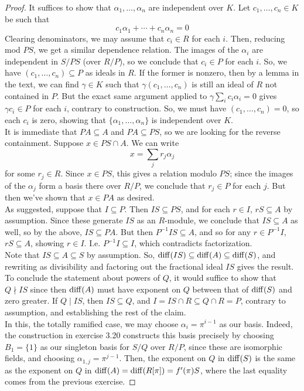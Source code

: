\begin{proof}
	It suffices to show that $\alpha_1,\ldots,\alpha_n$ are independent over $K$. Let $c_1,\ldots,c_n \in K$ be such that
	\[ c_1\alpha_1 + \cdots + c_n\alpha_n = 0 \]
	Clearing denominators, we may assume that $c_i \in R$ for each $i$. Then, reducing mod $PS$, we get a similar dependence relation. The images of the $\alpha_i$ are independent in $S/PS$ (over $R/P$), so we conclude that $c_i \in P$ for each $i$. So, we have $(c_1,\ldots,c_n) \subseteq P$ as ideals in $R$. If the former is nonzero, then by a lemma in the text, we can find $\gamma \in K$ such that $\gamma(c_1,\ldots,c_n)$ is still an ideal of $R$ not contained in $P$. But the exact same argument applied to $\gamma\sum_i c_i\alpha_i = 0$ gives $\gamma c_i \in P$ for each $i$, contrary to construction. So, we must have $(c_1,\ldots,c_n) = 0$, so each $c_i$ is zero, showing that $\{\alpha_1,\ldots,\alpha_n\}$ is independent over $K$. \\
	
	It is immediate that $PA \subseteq A$ and $PA \subseteq PS$, so we are looking for the reverse containment. Suppose $x \in PS \cap A$. We can write
	\[ x = \sum_j r_j\alpha_j \]
	for some $r_j \in R$. Since $x \in PS$, this gives a relation modulo $PS$; since the images of the $\alpha_j$ form a basis there over $R/P$, we conclude that $r_j \in P$ for each $j$. But then we've shown that $x \in PA$ as desired. \\
	
	As suggested, suppose that $I \subseteq P$. Then $IS \subseteq PS$, and for each $r \in I$, $rS \subseteq A$ by assumption. Since these generate $IS$ as an $R$-module, we conclude that $IS \subseteq A$ as well, so by the above, $IS \subseteq PA$. But then $P^{-1}IS \subseteq A$, and so for any $r \in P^{-1}I$, $rS \subseteq A$, showing $r \in I$. I.e. $P^{-1}I \subseteq I$, which contradicts factorization. \\
	
	Note that $IS \subseteq A \subseteq S$ by assumption. So, $\operatorname{diff}(IS) \subseteq \operatorname{diff}(A) \subseteq \operatorname{diff}(S)$, and rewriting as divisibility and factoring out the fractional ideal $IS$ gives the result. To conclude the statement about powers of $Q$, it would suffice to show that $Q \nmid IS$ since then $\operatorname{diff}(A)$ must have exponent on $Q$ between that of $\operatorname{diff}(S)$ and zero greater. If $Q \mid IS$, then $IS \subseteq Q$, and $I = IS \cap R \subseteq Q \cap R = P$, contrary to assumption, and establishing the rest of the claim. \\
	
	In this, the totally ramified case, we may choose $\alpha_i = \pi^{i-1}$ as our basis. Indeed, the construction in exercise 3.20 constructs this basis precisely by choosing $B_1 = \{1\}$ as our singleton basis for $S/Q$ over $R/P$, since these are isomorphic fields, and choosing $\alpha_{1,j} = \pi^{j-1}$. Then, the exponent on $Q$ in $\operatorname{diff}(S)$ is the same as the exponent on $Q$ in $\operatorname{diff}(A) = \operatorname{diff}(R[\pi]) = f'(\pi)S$, where the last equality comes from the previous exercise. 
\end{proof}
